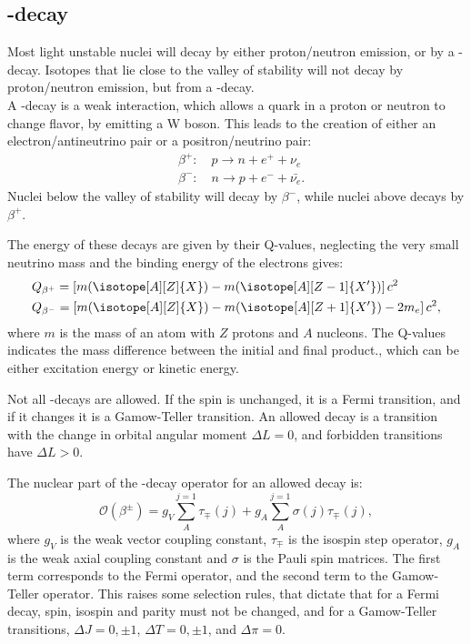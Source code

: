 
\subsection{\be-decay}
Most light unstable nuclei will decay by either proton/neutron emission, or by a \be-decay. Isotopes that lie close to the valley of stability will not decay by proton/neutron emission, but from a \be-decay.
\\
A \be-decay is a weak interaction, which allows a quark in a proton or neutron to change flavor, by emitting a W boson. This leads to the creation of either an electron/antineutrino pair or a positron/neutrino pair:
\begin{align}
&\beta^+:\quad p\rightarrow n + e^+ + \nu_e\\
&\beta^-:\quad n\rightarrow p + e^- + \bar{\nu_e}.
\end{align}
Nuclei below the valley of stability will decay by $\beta^-$, while nuclei above decays by $\beta ^+$.

The energy of these decays are given by their Q-values, neglecting the very small neutrino mass and the binding energy of the electrons gives:
\begin{align}
&Q_{\beta^+} = \left[ m (\isotope[A][Z]{X}) - m(\isotope[A][Z-1]{X'})  		 \right] c^2\\
&Q_{\beta^-} = \left[ m (\isotope[A][Z]{X}) - m(\isotope[A][Z+1]{X'}) -2m_e  \right] c^2,
\end{align}
where $m$ is the mass of an atom with $Z$ protons and $A$ nucleons.
The Q-values indicates the mass difference between the initial and final product., which can be either excitation energy or kinetic energy. 

Not all \be-decays are allowed. If the spin is unchanged, it is a Fermi transition, and if it changes it is a Gamow-Teller transition. 
An allowed decay is a transition with the change in orbital angular moment $\Delta L = 0$, and forbidden transitions have $\Delta L > 0$.

The nuclear part of the \be-decay operator for an allowed decay is:
\begin{equation}
	\mathcal{O} (\beta^\pm) = g_V \sum_{A}^{j=1}\tau_\mp (j) + g_A \sum_{A}^{j=1}\sigma(j)\tau_\mp(j),
\end{equation}
where $g_V$ is the weak vector coupling constant, $\tau_\mp$ is the isospin step operator, $g_A$ is the weak axial coupling constant and $\sigma$ is the Pauli spin matrices.
The first term corresponds to the Fermi operator, and the second term to the Gamow-Teller operator. 
This raises some selection rules, that dictate that for a Fermi decay, spin, isospin and parity must not be changed, and for a Gamow-Teller transitions, $\Delta J = 0, \pm1$, $\Delta T = 0, \pm 1$, and $\Delta \pi = 0$.

